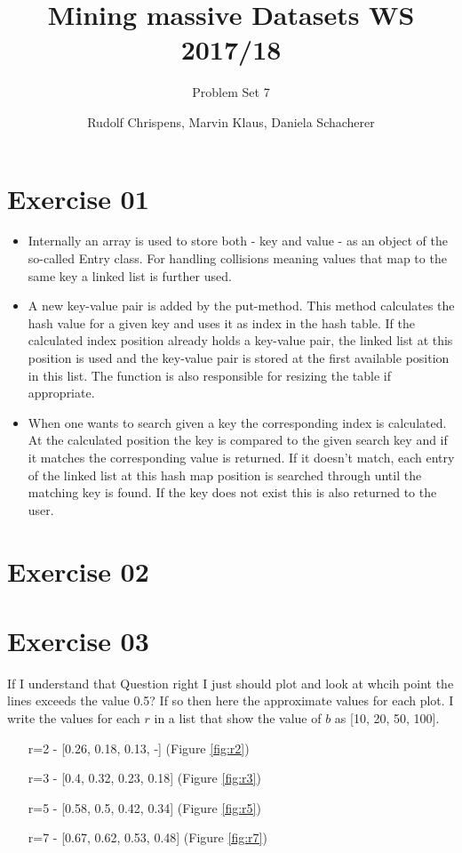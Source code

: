 \documentclass[11pt,a4paper]{scrartcl}
\title{Mining massive Datasets WS 2017/18}
\subtitle{Problem Set 7}
\author{Rudolf Chrispens, Marvin Klaus, Daniela Schacherer}
\begin{document}
\maketitle

\section*{Exercise 01}

\begin{itemize}
	\item Internally an array is used to store both - key and value - as an object of the so-called Entry class. For handling collisions meaning values that map to the same key a linked list is further used. 
	\item A new key-value pair is added by the put-method. This method calculates the hash value for a given key and uses it as index in the hash table. If the calculated index position already holds a key-value pair, the linked list at this position is used and the key-value pair is stored at the first available position in this list. The function is also responsible for resizing the table if appropriate.
	\item When one wants to search given a key the corresponding index is calculated. At the calculated position the key is compared to the given search key and if it matches the corresponding value is returned. If it doesn't match, each entry of the linked list at this hash map position is searched through until the matching key is found. If the key does not exist this is also returned to the user.
\end{itemize} 

\section*{Exercise 02}

\section*{Exercise 03}

If I understand that Question right I just should plot and look at whcih point the lines exceeds the value 0.5? If so then here the approximate values for each plot. I write the values for each $r$ in a list that show the value of $b$ as [10, 20, 50, 100].

\begin{itemize}
    \item [r=2] - [0.26, 0.18, 0.13, -] (Figure \ref{fig:r2})
    \item [r=3] - [0.4, 0.32, 0.23, 0.18] (Figure \ref{fig:r3})
    \item [r=5] - [0.58, 0.5, 0.42, 0.34] (Figure \ref{fig:r5})
    \item [r=7] - [0.67, 0.62, 0.53, 0.48] (Figure \ref{fig:r7})
\end{itemize}
\end{document}
